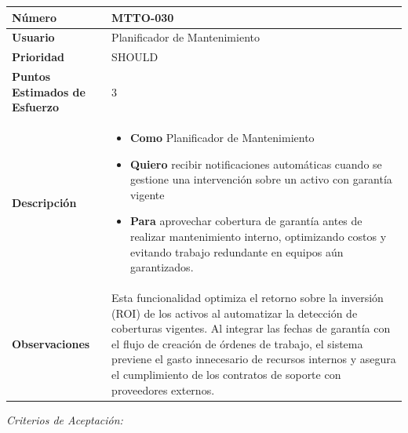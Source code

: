 \begin{longtable}{|p{0.21\textwidth}|p{0.74\textwidth}|}\hline
\textbf{Número} & MTTO-030 \\ \hline
\textbf{Usuario} & Planificador de Mantenimiento \\ \hline
\textbf{Prioridad} & SHOULD \\ \hline
\textbf{Puntos Estimados de Esfuerzo} & 3 \\ \hline
\textbf{Descripción} & \parbox[t]{\linewidth}{\vspace{2pt}\begin{itemize}[leftmargin=1.5em, nosep, topsep=0pt]
\item \textbf{Como} Planificador de Mantenimiento
\item \textbf{Quiero} recibir notificaciones automáticas cuando se gestione una intervención sobre un activo con garantía vigente
\item \textbf{Para} aprovechar cobertura de garantía antes de realizar mantenimiento interno, optimizando costos y evitando trabajo redundante en equipos aún garantizados.
\end{itemize}\vspace{2pt}} \\ \hline
\textbf{Observaciones} & Esta funcionalidad optimiza el retorno sobre la inversión (ROI) de los activos al automatizar la detección de coberturas vigentes. Al integrar las fechas de garantía con el flujo de creación de órdenes de trabajo, el sistema previene el gasto innecesario de recursos internos y asegura el cumplimiento de los contratos de soporte con proveedores externos. \\ \hline
\end{longtable}\normalsize
\noindent\textit{Criterios de Aceptación:}
